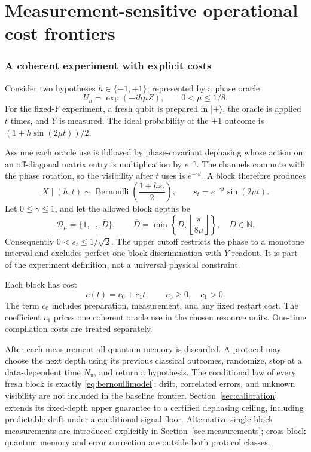 \documentclass[11pt,a4paper]{article}
\newcommand{\ket}[1]{\lvert #1\rangle}
\theoremstyle{definition}
\theoremstyle{remark}
\numberwithin{equation}{section}
\begin{document}
\FloatBarrier\clearpage
\part{Measurement-sensitive operational cost frontiers}\label{part:operational}
\section{A coherent experiment with explicit costs}\label{sec:blockmodel}
Consider two hypotheses $h\in\{-1,+1\}$, represented by a phase oracle
\begin{equation}
 U_h=\exp(-ih\mu Z),\qquad 0<\mu\leq1/8.
\end{equation}
For the fixed-$Y$ experiment, a fresh qubit is prepared in $\ket{+}$, the oracle is applied $t$ times,
and $Y$ is measured. The ideal probability of the $+1$ outcome is
$(1+h\sin(2\mu t))/2$.

Assume each oracle use is followed by phase-covariant dephasing whose action
on an off-diagonal matrix entry is multiplication by $e^{-\gamma}$.
The channels commute with the phase rotation, so the visibility after $t$
uses is $e^{-\gamma t}$. A block therefore produces
\begin{equation}\label{eq:bernoullimodel}
 X\mid(h,t)\sim\operatorname{Bernoulli}\left(\frac{1+hs_t}{2}\right),
 \qquad s_t=e^{-\gamma t}\sin(2\mu t).
\end{equation}
Let $0\leq\gamma\leq1$, and let the allowed block depths be
\begin{equation}\label{eq:depthset}
 \mathcal D_\mu=\{1,\ldots,\overline D\},\qquad
 \overline D=\min\left\{D,\left\lfloor\frac{\pi}{8\mu}\right\rfloor\right\},
 \quad D\in\mathbb N.
\end{equation}
Consequently $0<s_t\leq1/\sqrt2$. The upper cutoff restricts the phase to a monotone interval
and excludes perfect one-block discrimination with $Y$ readout. It is part of the
experiment definition, not a universal physical constraint.

Each block has cost
\begin{equation}\label{eq:blockcost}
 c(t)=c_0+c_1t,\qquad c_0\geq0,\quad c_1>0.
\end{equation}
The term $c_0$ includes preparation, measurement, and any fixed restart
cost. The coefficient $c_1$ prices one coherent oracle use in the chosen
resource units. One-time compilation costs are treated separately.

After each measurement all quantum memory is discarded. A protocol may
choose the next depth using its previous classical outcomes, randomize,
stop at a data-dependent time $N_\pi$, and return a hypothesis.
The conditional law of every fresh block is exactly
\eqref{eq:bernoullimodel}; drift, correlated errors, and unknown visibility
are not included in the baseline frontier. Section~\ref{sec:calibration}
extends its fixed-depth upper guarantee to a certified dephasing ceiling,
including predictable drift under a conditional signal floor. Alternative
single-block measurements are introduced explicitly in
Section~\ref{sec:measurements}; cross-block quantum memory and error
correction are outside both protocol classes.
\end{document}
